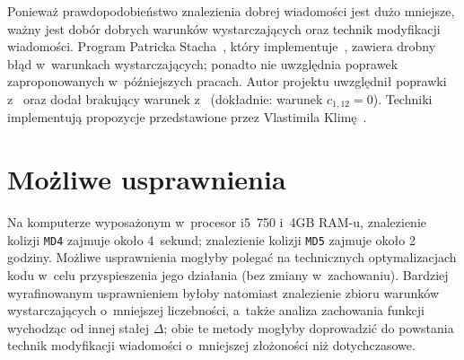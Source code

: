 \documentclass[12pt,a4paper,twoside]{article}
\begin{document}
Ponieważ prawdopodobieństwo znalezienia dobrej wiadomości jest dużo mniejsze,
ważny jest dobór dobrych warunków wystarczających oraz technik modyfikacji
wiadomości. Program Patricka Stacha~\cite{stach2005md5}, który
implementuje~\cite{wang2005md5}, zawiera drobny błąd w~warunkach
wystarczających; ponadto nie uwzględnia poprawek zaproponowanych w~późniejszych
pracach. Autor projektu uwzględnił poprawki
z~\cite{yajima2005wang,sasaki2005improved,liang2007improved} oraz dodał
brakujący warunek z~\cite{wang2005md5} (dokładnie: warunek $c_{1,12} = 0$).
Techniki  implementują propozycje
przedstawione przez Vlastimila Klimę~\cite{klima2005finding2}.

\section{Możliwe usprawnienia}

Na komputerze wyposażonym w~procesor i5~750 i~4GB RAM-u, znalezienie kolizji
\texttt{MD4} zajmuje około 4~sekund; znalezienie kolizji
\texttt{MD5} zajmuje około 2 godziny. Możliwe usprawnienia
mogłyby polegać na technicznych optymalizacjach kodu w~celu przyspieszenia jego
działania (bez zmiany w~zachowaniu). Bardziej wyrafinowanym usprawnieniem
byłoby natomiast znalezienie zbioru warunków wystarczających o~mniejszej
liczebności, a~także analiza zachowania funkcji wychodząc od innej stałej
$\Delta$; obie te metody mogłyby doprowadzić do powstania technik modyfikacji
wiadomości o~mniejszej złożoności niż dotychczasowe.

\newpage


\end{document}
